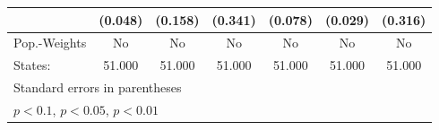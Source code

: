 {\begin{tabular}{l*{6}{c}}
            &     (0.048)         &     (0.158)         &     (0.341)         &     (0.078)         &     (0.029)         &     (0.316)         \\
\hline
Pop.-Weights&          No         &          No         &          No         &          No         &          No         &          No         \\
States:     &      51.000         &      51.000         &      51.000         &      51.000         &      51.000         &      51.000         \\
\hline\hline
\multicolumn{7}{l}{\footnotesize Standard errors in parentheses}\\
\multicolumn{7}{l}{\footnotesize \sym{*} \(p<0.1\), \sym{**} \(p<0.05\), \sym{***} \(p<0.01\)}\\
\end{tabular}
}
